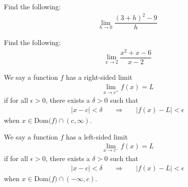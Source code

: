\begin{exercise} Find the following:
\begin{align*}
    \lim_{h \longrightarrow 0} \dfrac{(3+h)^{2} - 9}{h}
\end{align*}
\end{exercise}

\begin{exercise}
Find the following:
\begin{align*}
    \lim_{x \longrightarrow 2} \dfrac{x^{2}+x-6}{x-2}
\end{align*}
\end{exercise}

\begin{definition}
We say a function $f$ has a right-sided limit
\begin{align*}
    \lim_{x \longrightarrow c^{+}} f(x) = L
\end{align*}
if for all $\epsilon > 0$, there exists a $\delta > 0$ such that
\begin{align*}
    \lvert x - c \rvert < \delta \hspace{20pt} \Longrightarrow \hspace{20pt} \lvert f(x) - L \rvert < \epsilon
\end{align*}
when $x \in \text{Dom($f$)} \cap (c, \infty)$.
\end{definition}

\begin{definition}
We say a function $f$ has a left-sided limit
\begin{align*}
    \lim_{x \longrightarrow c^{-}} f(x) = L
\end{align*}
if for all $\epsilon > 0$, there exists a $\delta > 0$ such that
\begin{align*}
    \lvert x - c \rvert < \delta \hspace{20pt} \Longrightarrow \hspace{20pt} \lvert f(x) - L \rvert < \epsilon
\end{align*}
when $x \in \text{Dom($f$)} \cap (-\infty, c)$.
\end{definition}

